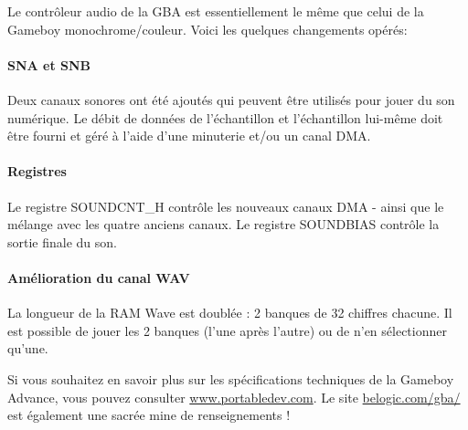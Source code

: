 Le contrôleur audio de la GBA est essentiellement le même que celui de la Gameboy monochrome/couleur.
Voici les quelques changements opérés:

\paragraph{SNA et SNB} Deux canaux sonores ont été ajoutés qui peuvent être utilisés pour jouer du son numérique.
                      Le débit de données de l'échantillon et l'échantillon lui-même doit être fourni et géré à l'aide d'une minuterie et/ou un canal DMA.

\paragraph{Registres} Le registre SOUNDCNT\_H contrôle les nouveaux canaux DMA - ainsi que le mélange avec les quatre anciens canaux.
                      Le registre SOUNDBIAS contrôle la sortie finale du son.

\paragraph{Amélioration du canal WAV} La longueur de la RAM Wave est doublée : 2 banques de 32 chiffres chacune.
                      Il est possible de jouer les 2 banques (l'une après l'autre) ou de n'en sélectionner qu'une.

\medskip
Si vous souhaitez en savoir plus sur les spécifications techniques de la Gameboy Advance,
vous pouvez consulter \href{http://www.portabledev.com/media/GBA/tutoriels/gbatek.htm}{www.portabledev.com}.
Le site \href{http://belogic.com/gba/}{belogic.com/gba/} est également une sacrée mine de renseignements !
